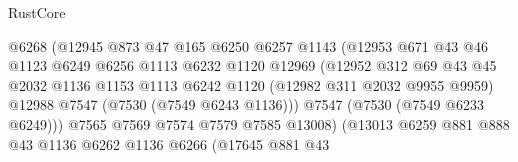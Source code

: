 \begin{lexlean}{RustCore}
\begin{coremodule}
                                      @6268
                                      (@12945
                                        @873
                                        @47
                                        @165
                                        @6250
                                        @6257
                                        @1143
                                        (@12953
                                          @671
                                          @43
                                          @46
                                          @1123
                                          @6249
                                          @6256
                                          @1113
                                          @6232
                                          @1120
                                          @12969
                                          (@12952
                                            @312
                                            @69
                                            @43
                                            @45
                                            @2032
                                            @1136
                                            @1153
                                            @1113
                                            @6242
                                            @1120
                                            (@12982 @311 @2032 @9955 @9959)
                                            @12988
                                            @7547
                                            (@7530 (@7549 @6243 @1136)))
                                          @7547
                                          (@7530 (@7549 @6233 @6249)))
                                        @7565
                                        @7569
                                        @7574
                                        @7579
                                        @7585
                                        @13008)
                                      (@13013
                                        @6259
                                        @881
                                        @888
                                        @43
                                        @1136
                                        @6262
                                        @1136
                                        @6266
                                        (@17645
                                          @881
                                          @43

\end{coremodule}
\end{lexlean}
